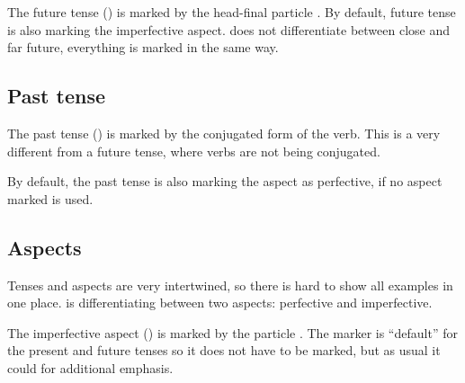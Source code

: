 The future tense (\Fut{}) is marked by the head-final particle . By
default, future tense is also marking the imperfective aspect. \andro does not
differentiate between close and far future, everything is marked in the same
way.




\subsection{Past tense}

The past tense (\Pst{}) is marked by the conjugated form of the verb. This is a
very different from a future tense, where verbs are not being conjugated.


By default, the past tense is also marking the aspect as perfective, if no
aspect marked is used.

\subsection{Aspects}

Tenses and aspects are very intertwined, so there is hard to show all examples in
one place. \andro is differentiating between two aspects: perfective and
imperfective.

The imperfective aspect (\Ipfv{}) is marked by the particle . The
marker is ``default'' for the present and future tenses so it does not have to
be marked, but as usual it could for additional emphasis.






